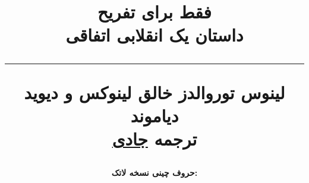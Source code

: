 \title{
\textbf{\Huge فقط برای تفریح} \\
\vspace*{10pt}
\textbf{\Large داستان یک انقلابی اتفاقی}
\vspace*{10pt}
\hrule
\vspace*{10pt}
\centering
لینوس توروالدز خالق لینوکس و دیوید دیاموند \\
\vspace*{10pt}
ترجمه \href{http://www.jadi.net/}{جادی}
\vfill}

\author{}
\date{\textbf{\small حروف چینی نسخه لاتک: \href{http://www.github.com/mxamin/}{}}}

